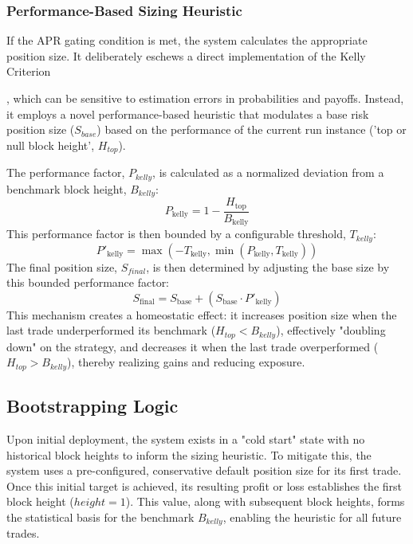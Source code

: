 \documentclass[11pt]{article}
\begin{document}
\subsubsection{Performance-Based Sizing Heuristic}
If the APR gating condition is met, the system calculates the appropriate position size. It deliberately eschews a direct implementation of the Kelly Criterion\cite{kelly1956new}{\cite{tharpinstitute_peak}, which can be sensitive to estimation errors in probabilities and payoffs. Instead, it employs a novel performance-based heuristic that modulates a base risk position size ($S_{base}$) based on the performance of the current run instance ('top or null block height', $H_{top}$).

The performance factor, $P_{kelly}$, is calculated as a normalized deviation from a benchmark block height, $B_{kelly}$:
$$
P_{\text{kelly}} = 1 - \frac{H_{\text{top}}}{B_{\text{kelly}}}
$$
This performance factor is then bounded by a configurable threshold, $T_{kelly}$:
$$
P'_{\text{kelly}} = \max(-T_{\text{kelly}}, \min(P_{\text{kelly}}, T_{\text{kelly}}))
$$
The final position size, $S_{final}$, is then determined by adjusting the base size by this bounded performance factor:
$$
S_{\text{final}} = S_{\text{base}} + (S_{\text{base}} \cdot P'_{\text{kelly}})
$$
This mechanism creates a homeostatic effect: it increases position size when the last trade underperformed its benchmark ($H_{top} < B_{kelly}$), effectively "doubling down" on the strategy, and decreases it when the last trade overperformed ($H_{top} > B_{kelly}$), thereby realizing gains and reducing exposure.

\subsection{Bootstrapping Logic}
Upon initial deployment, the system exists in a "cold start" state with no historical block heights to inform the sizing heuristic. To mitigate this, the system uses a pre-configured, conservative default position size for its first trade. Once this initial target is achieved, its resulting profit or loss establishes the first block height ($height = 1$). This value, along with subsequent block heights, forms the statistical basis for the benchmark $B_{kelly}$, enabling the heuristic for all future trades.

}
\end{document}

